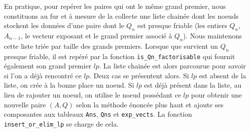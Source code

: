 En pratique, pour repérer les paires qui ont le même grand premier, nous
constituons au fur et à mesure de la collecte une liste chainée dont les noeuds
stockent les données d'une paire dont le $Q_n$ est presque friable (les entiers
$Q_n$, $A_{n-1}$, le vecteur exposant et le grand premier associé à $Q_n$). Nous
maintenons cette liste triée par taille des grands premiers. Lorsque que survient
un $Q_n$ presque friable, il est repéré par la fonction
\texttt{is\_Qn\_factorisable} qui fournit également son grand premier $lp$. La 
liste chainée est alors parcourue pour savoir si l'on a déjà rencontré ce $lp$.
Deux cas se présentent alors. Si $lp$ est absent de la liste, on crée à la bonne
place un noeud. Si $lp$ est déjà présent dans la liste, au lieu de rajouter un
noeud, on utilise le noeud possédant ce $lp$ pour obtenir une nouvelle paire
$(A,Q)$ selon la méthode énoncée plus haut et ajoute ses composantes aux tableaux
\texttt{Ans}, \texttt{Qns} et \texttt{exp\_vects}. La fonction
\texttt{insert\_or\_elim\_lp} se charge de cela. \\




